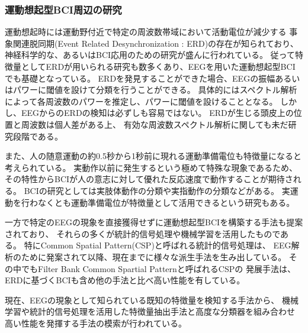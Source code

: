 \subsubsection{\mc 運動想起型\rm BCI\mc 周辺の研究}
運動想起時には運動野付近で特定の周波数帯域において活動電位が減少する
事象関連脱同期(Event Related Desynchronization : ERD)の存在が知られており、
神経科学的な、あるいはBCI応用のための研究が盛んに行われている\cite{ERDとERS,ERDリハビリ,運動フィードバック}。
従って特徴量としてERDが用いられる研究も数多くあり、EEGを用いた運動想起型BCIでも基礎となっている\cite{プリミティブERD,Beta波によるBCI,waveletFSVM}。
ERDを発見することができた場合、EEGの振幅あるいはパワーに閾値を設けて分類を行うことができる。
具体的にはスペクトル解析によって各周波数のパワーを推定し、パワーに閾値を設けることとなる。
しかし、EEGからのERDの検知は必ずしも容易ではない。
ERDが生じる頭皮上の位置と周波数は個人差がある上、
有効な周波数スペクトル解析に関しても未だ研究段階である\cite{時間周波数解析の比較}。

また、人の随意運動の約0.5秒から1秒前に現れる運動準備電位も特徴量になると考えられている。
実動作以前に発生するという極めて特殊な現象であるため、
その特性からBCIが人の意志に対して優れた反応速度で動作することが期待される。
BCIの研究としては実肢体動作の分類\cite{運動準備電位肢体}や実指動作の分類\cite{運動準備電位指}などがある。
実運動を行わなくとも運動準備電位が特徴量として活用できるという研究\cite{運動準備電位想起,運動準備電位想起2}もある。

一方で特定のEEGの現象を直接獲得せずに運動想起型BCIを構築する手法も提案されており、
それらの多くが統計的信号処理や機械学習を活用したものである。
特にCommon Spatial Pattern(CSP)と呼ばれる統計的信号処理\cite{CSP1990,CSP1999}は、
EEG解析のために発案されて以降、現在までに様々な派生手法を生み出している\cite{csssp,正則化CSP,カーネルCSP,cvscsp}。
その中でもFilter Bank Common Spartial Pattern\cite{fbcsp}と呼ばれるCSPの
発展手法は、ERDに基づくBCIも含め他の手法と比べ高い性能を有している。

現在、EEGの現象として知られている既知の特徴量を検知する手法から、
機械学習や統計的信号処理を活用した特徴量抽出手法と高度な分類器を組み合わせ
高い性能を発揮する手法の模索が行われている\cite{BCIの比較}。
